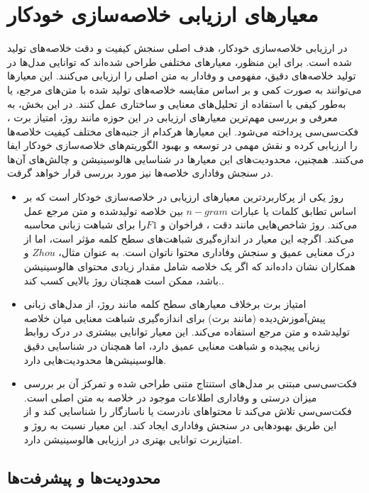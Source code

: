 \section{معیارهای ارزیابی خلاصه‌سازی خودکار}
در ارزیابی خلاصه‌سازی خودکار، هدف اصلی سنجش کیفیت و دقت خلاصه‌های تولید شده است. برای این منظور، معیارهای مختلفی طراحی شده‌اند که توانایی مدل‌ها در تولید خلاصه‌های دقیق، مفهومی و وفادار به متن اصلی را ارزیابی می‌کنند. این معیارها می‌توانند به صورت کمی و بر اساس مقایسه خلاصه‌های تولید شده با متن‌های مرجع، یا به‌طور کیفی با استفاده از تحلیل‌های معنایی و ساختاری عمل کنند. در این بخش، به معرفی و بررسی مهم‌ترین معیارهای ارزیابی در این حوزه مانند روژ، امتیاز برت ، فکت‌سی‌سی پرداخته می‌شود. این معیارها هرکدام از جنبه‌های مختلف کیفیت خلاصه‌ها را ارزیابی کرده و نقش مهمی در توسعه و بهبود الگوریتم‌های خلاصه‌سازی خودکار ایفا می‌کنند. همچنین، محدودیت‌های این معیارها در شناسایی هالوسینیشن و چالش‌های آن‌ها در سنجش وفاداری خلاصه‌ها نیز مورد بررسی قرار خواهد گرفت.
\begin{itemize}
	\item روژ
	 یکی از پرکاربردترین معیارهای ارزیابی در خلاصه‌سازی خودکار است که بر اساس تطابق کلمات یا عبارات $n-gram$ بین خلاصه تولیدشده و متن مرجع عمل می‌کند. روژ شاخص‌هایی مانند دقت  ، فراخوان  و $F1 $را برای شباهت زبانی محاسبه می‌کند. اگرچه این معیار در اندازه‌گیری شباهت‌های سطح کلمه مؤثر است، اما از درک معنایی عمیق و سنجش وفاداری محتوا ناتوان است. به عنوان مثال، $Zhou$ و همکاران نشان داده‌اند که اگر یک خلاصه شامل مقدار زیادی محتوای هالوسینیشن باشد، ممکن است همچنان روژ بالایی کسب کند.\cite{zhou-etal-2021-detecting,lin-2004-rouge}.
	\item 
	امتیاز برت برخلاف معیارهای سطح کلمه مانند روژ، از مدل‌های زبانی پیش‌آموزش‌دیده (مانند برت) برای اندازه‌گیری شباهت معنایی میان خلاصه تولیدشده و متن مرجع استفاده می‌کند. این معیار توانایی بیشتری در درک روابط زبانی پیچیده و شباهت معنایی عمیق دارد، اما همچنان در شناسایی دقیق هالوسینیشن‌ها محدودیت‌هایی دارد\cite{zhang-etal-2024-benchmarking}.
	\item 
	فکت‌سی‌سی مبتنی بر مدل‌های استنتاج متنی طراحی شده و تمرکز آن بر بررسی میزان درستی و وفاداری اطلاعات موجود در خلاصه به متن اصلی است. فکت‌سی‌سی تلاش می‌کند تا محتواهای نادرست یا ناسازگار را شناسایی کند و از این طریق بهبودهایی در سنجش وفاداری ایجاد کند. این معیار نسبت به روژ و امتیازبرت توانایی بهتری در ارزیابی هالوسینیشن دارد\cite{factcc-etal-2020-evaluating}.
\end{itemize}
\subsection{محدودیت‌ها و پیشرفت‌ها}

